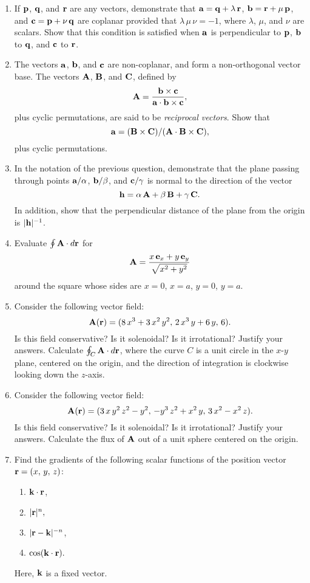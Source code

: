 {\begin{enumerate}
\item If ${\bf p}$, ${\bf q}$, and ${\bf r}$ are any vectors, demonstrate that 
${\bf a}={\bf q} + \lambda\,{\bf r}$, ${\bf b} = {\bf r}+\mu\,{\bf p}$,
and ${\bf c} = {\bf p} + \nu\,{\bf q}$ are coplanar provided that
$\lambda\,\mu\,\nu=-1$, where $\lambda$, $\mu$, and $\nu$ are scalars.
Show that this condition is satisfied when ${\bf a}$ is perpendicular to ${\bf p}$, ${\bf b}$ to ${\bf q}$, and ${\bf c}$ to ${\bf r}$.

\item The vectors ${\bf a}$, ${\bf b}$, and ${\bf c}$ are non-coplanar, and
form a non-orthogonal vector base. The vectors ${\bf A}$, ${\bf B}$,
and ${\bf C}$, defined by
$$
{\bf A} = \frac{{\bf b}\times {\bf c}}{{\bf a}\cdot{\bf b}\times {\bf c}},
$$
plus cyclic permutations, are said to be {\em reciprocal vectors}. Show that
 $$
 {\bf a} = ({\bf B}\times {\bf C})/({\bf A}\cdot{\bf B}\times {\bf C}),
 $$
plus cyclic permutations.

\item In the notation of the previous question, demonstrate that the plane passing
through points ${\bf a}/\alpha$, ${\bf b}/\beta$, and ${\bf c}/\gamma$
is normal to the direction of the vector
$$
{\bf h} = \alpha\,{\bf A} + \beta\,{\bf B} + \gamma\,{\bf C}.
$$
In addition, show that the perpendicular distance of the plane from the
origin is $|{\bf h}|^{-1}$.

\item Evaluate $\oint {\bf A}\cdot d{\bf r}$ for
$$
{\bf A} = \frac{x\,{\bf e}_x + y\,{\bf e}_y}{\sqrt{x^2 + y^2}}
$$
around the square whose sides are $x=0$, $x=a$, $y=0$, $y=a$. 

\item Consider the following vector field:
$$
{\bf A}({\bf r}) = (8\,x^3+3\,x^2\,y^2,\,2\,x^3\,y+6\,y,\,6).
$$
Is this field conservative? Is it solenoidal? Is it irrotational? Justify your answers. Calculate $\oint_C {\bf A}\cdot d{\bf r}$, where the curve
$C$ is a unit circle in the $x$-$y$ plane, centered on the origin, and the
direction of integration is clockwise looking down the $z$-axis.

\item Consider the following vector field:
$$
{\bf A}({\bf r}) = (3\,x\,y^2\,z^2-y^2,\,-y^3\,z^2+x^2\,y,\,3\,x^2-x^2\,z).
$$
Is this field conservative? Is it solenoidal? Is it irrotational? Justify your answers. Calculate the flux of ${\bf A}$ out of a unit sphere centered
on the origin.


\item Find the gradients of the following scalar functions of the position vector ${\bf r}=(x,\,y,\,z)$:
\begin{enumerate}
\item ${\bf k}\cdot{\bf r}$,
\item $|{\bf r}|^n,$
\item $|{\bf r}-{\bf k}|^{-n}$,
\item $\cos({\bf k}\cdot {\bf r}).$
\end{enumerate}
Here, ${\bf k}$ is a fixed vector.


\end{enumerate}}
